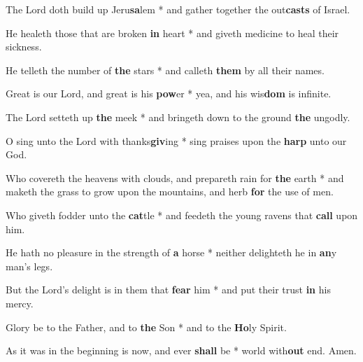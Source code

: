 \begin{multicols}{2}
	The Lord doth build up Jeru\textbf{sa}lem * and gather together the out\textbf{casts} of Israel.
	
	He healeth those that are broken \textbf{in} heart * and giveth medicine to heal their sickness.
	
	He telleth the number of \textbf{the} stars * and calleth \textbf{them} by all their names.
	
	Great is our Lord, and great is his \textbf{pow}er * yea, and his wis\textbf{dom} is infinite.
	
	The Lord setteth up \textbf{the} meek * and bringeth down to the ground \textbf{the} ungodly.
	
	O sing unto the Lord with thanks\textbf{giv}ing * sing praises upon the \textbf{harp} unto our God.
	
	Who covereth the heavens with clouds, and prepareth rain for \textbf{the} earth * and maketh the grass to grow upon the mountains, and herb \textbf{for} the use of men.
	
	Who giveth fodder unto the \textbf{cat}tle * and feedeth the young ravens that \textbf{call} upon him.
	
	He hath no pleasure in the strength of \textbf{a} horse * neither delighteth he in \textbf{an}y man's legs.
	
	But the Lord's delight is in them that \textbf{fear} him * and put their trust \textbf{in} his mercy.
	
	Glory be to the Father, and to \textbf{the} Son * and to the \textbf{Ho}ly Spirit.
	
	As it was in the beginning is now, and ever \textbf{shall} be * world with\textbf{out} end. Amen.
\end{multicols}